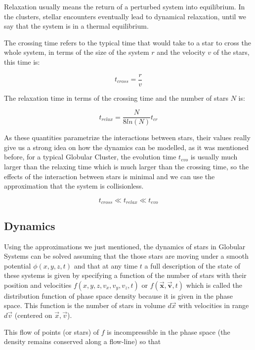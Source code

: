 Relaxation usually means the return of a perturbed system into equilibrium. In the clusters, stellar encounters eventually lead to dynamical relaxation, until we say that the system is in a thermal equilibrium. 

The crossing time refers to the typical time that would take to a star to cross the whole system, in terms of the size of the system $r$ and the velocity $v$ of the stars, this time is:

\begin{equation}
t_{cross}=\frac{r}{v}
\end{equation}

The relaxation time in terms of the crossing time and the number of stars $N$ is:

\begin{equation}
t_{relax}=\frac{N}{8ln(N)}t_{cr}
\end{equation}

As these quantities parametrize the interactions between stars, their values really give us a strong idea on how the dynamics can be modelled, as it was mentioned before, for a typical Globular Cluster, the evolution time $t_{evo}$ is usually much larger than the relaxing time which is much larger than the crossing time, so the effects of the interaction between stars is minimal and we can use the approximation that the system is collisionless.

\begin{equation}
t_{cross}\ll t_{relax}\ll t_{evo}
\end{equation}

\subsection{Dynamics}

Using the approximations we just mentioned, the dynamics of stars in Globular Systems can be solved assuming that the those stars are moving under a smooth potential $\phi (x,y,z,t)$ and that at any time $t$ a full description of the state of these systems is given by specifying a function of the number of stars with their position and velocities $f(x,y,z,v_{x},v_{y},v_{z},t)$ or $f(\vec{\textbf{x}},\vec{\textbf{v}},t)$ which is called the distribution function of phase space density because it is given in the phase space. This function is the number of stars in volume $d\vec{x}$ with velocities in range $d\vec{v}$ (centered on $\vec{x},\vec{v}$).

This flow of points (or stars) of $f$ is incompressible in the phase space (the density remains conserved along a flow-line) so that

